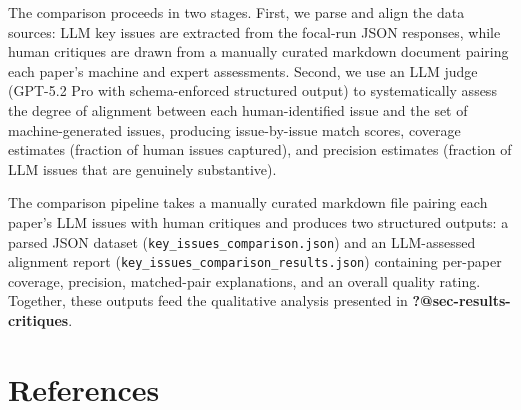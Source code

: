\documentclass[
  11pt,
  letterpaper,
]{article}
\begin{document}
The comparison proceeds in two stages. First, we parse and align the
data sources: LLM key issues are extracted from the focal-run JSON
responses, while human critiques are drawn from a manually curated
markdown document pairing each paper's machine and expert assessments.
Second, we use an LLM judge (GPT-5.2 Pro with schema-enforced structured
output) to systematically assess the degree of alignment between each
human-identified issue and the set of machine-generated issues,
producing issue-by-issue match scores, coverage estimates (fraction of
human issues captured), and precision estimates (fraction of LLM issues
that are genuinely substantive).

The comparison pipeline takes a manually curated markdown file pairing
each paper's LLM issues with human critiques and produces two structured
outputs: a parsed JSON dataset (\texttt{key\_issues\_comparison.json})
and an LLM-assessed alignment report
(\texttt{key\_issues\_comparison\_results.json}) containing per-paper
coverage, precision, matched-pair explanations, and an overall quality
rating. Together, these outputs feed the qualitative analysis presented
in \textbf{?@sec-results-critiques}.

\normalsize


\section*{References}\label{references}

\end{document}
